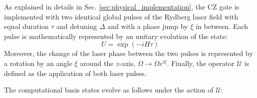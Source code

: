 \documentclass[rmp,10pt,onecolumn,fleqn,notitlepage]{revtex4-1}
\begin{document}
As explained in details in Sec. \ref{sec:physical_implementation}, the CZ gate is implemented with two identical global pulses of the Rydberg laser field with equal duration $\tau$ and detuning $\Delta$ and with a phase jump by $\xi$ in between. Each pulse is mathematically represented by an unitary evolution of the state:
\begin{equation}
    U = \exp(-i H \tau)
    \label{eq:unitary_evolution}
\end{equation}
Moreover, the change of the laser phase between the two pulses is represented by a rotation by an angle $\xi$ around the $z$-axis, $\Omega \rightarrow \Omega e^{i\xi}$. Finally, the operator $\mathcal{U}$ is defined as the application of both laser pulses. 

The computational basis states evolve as follows under the action of $\mathcal{U}$:
\end{document}
